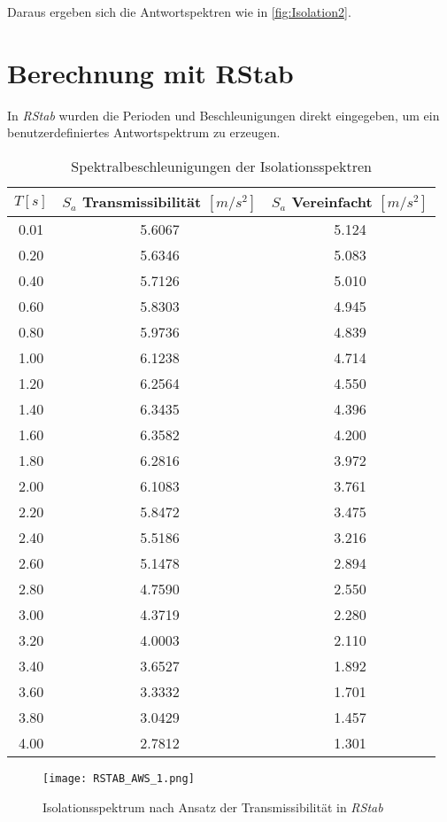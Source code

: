 Daraus ergeben sich die Antwortspektren wie in \cref{fig:Isolation2}.

\pagebreak

\section{Berechnung mit RStab}
\label{sec:rstab}

In \emph{RStab} wurden die Perioden und Beschleunigungen direkt eingegeben, um ein benutzerdefiniertes Antwortspektrum zu erzeugen.

\begin{table}[H]
\centering
\begin{tabular}{ |c|c|c| } 
 \hline
 $T [s]$ & $S_a$ Transmissibilität $[m/s^2]$ & $S_a$ Vereinfacht $[m/s^2]$\\
 \hline\hline
0.01 & 5.6067 & 5.124\\
0.20 & 5.6346 & 5.083\\
0.40 & 5.7126 & 5.010\\
0.60 & 5.8303 & 4.945\\
0.80 & 5.9736 & 4.839\\
1.00 & 6.1238 & 4.714\\
1.20 & 6.2564 & 4.550\\
1.40 & 6.3435 & 4.396\\
1.60 & 6.3582 & 4.200\\
1.80 & 6.2816 & 3.972\\
2.00 & 6.1083 & 3.761\\
2.20 & 5.8472 & 3.475\\
2.40 & 5.5186 & 3.216\\
2.60 & 5.1478 & 2.894\\
2.80 & 4.7590 & 2.550\\
3.00 & 4.3719 & 2.280\\
3.20 & 4.0003 & 2.110\\
3.40 & 3.6527 & 1.892\\
3.60 & 3.3332 & 1.701\\
3.80 & 3.0429 & 1.457\\
4.00 & 2.7812 & 1.301\\
 \hline
\end{tabular}
\caption{Spektralbeschleunigungen der Isolationsspektren}
\end{table}

\pagebreak

\begin{figure}[H]
    \centering
    \texttt{[image: RSTAB\_AWS\_1.png]}
    \caption{Isolationsspektrum nach Ansatz der Transmissibilität in \emph{RStab}}
\end{figure}

